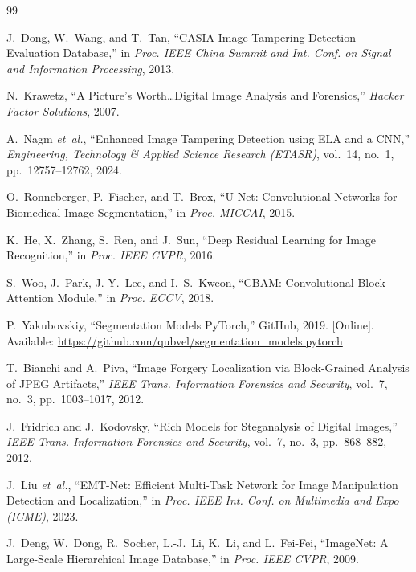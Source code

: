 \documentclass[conference]{IEEEtran}
\begin{document}
\begin{thebibliography}{99}

J.~Dong, W.~Wang, and T.~Tan, ``CASIA Image Tampering Detection Evaluation Database,'' in \textit{Proc. IEEE China Summit and Int. Conf. on Signal and Information Processing}, 2013.

N.~Krawetz, ``A Picture's Worth\ldots Digital Image Analysis and Forensics,'' \textit{Hacker Factor Solutions}, 2007.

A.~Nagm \textit{et~al.}, ``Enhanced Image Tampering Detection using ELA and a CNN,'' \textit{Engineering, Technology \& Applied Science Research (ETASR)}, vol.~14, no.~1, pp.~12757--12762, 2024.

O.~Ronneberger, P.~Fischer, and T.~Brox, ``U-Net: Convolutional Networks for Biomedical Image Segmentation,'' in \textit{Proc. MICCAI}, 2015.

K.~He, X.~Zhang, S.~Ren, and J.~Sun, ``Deep Residual Learning for Image Recognition,'' in \textit{Proc. IEEE CVPR}, 2016.

S.~Woo, J.~Park, J.-Y.~Lee, and I.~S.~Kweon, ``CBAM: Convolutional Block Attention Module,'' in \textit{Proc. ECCV}, 2018.

P.~Yakubovskiy, ``Segmentation Models PyTorch,'' GitHub, 2019. [Online]. Available: \url{https://github.com/qubvel/segmentation_models.pytorch}

T.~Bianchi and A.~Piva, ``Image Forgery Localization via Block-Grained Analysis of JPEG Artifacts,'' \textit{IEEE Trans. Information Forensics and Security}, vol.~7, no.~3, pp.~1003--1017, 2012.

J.~Fridrich and J.~Kodovsky, ``Rich Models for Steganalysis of Digital Images,'' \textit{IEEE Trans. Information Forensics and Security}, vol.~7, no.~3, pp.~868--882, 2012.

J.~Liu \textit{et~al.}, ``EMT-Net: Efficient Multi-Task Network for Image Manipulation Detection and Localization,'' in \textit{Proc. IEEE Int. Conf. on Multimedia and Expo (ICME)}, 2023.

J.~Deng, W.~Dong, R.~Socher, L.-J.~Li, K.~Li, and L.~Fei-Fei, ``ImageNet: A Large-Scale Hierarchical Image Database,'' in \textit{Proc. IEEE CVPR}, 2009.


\end{thebibliography}
\end{document}
